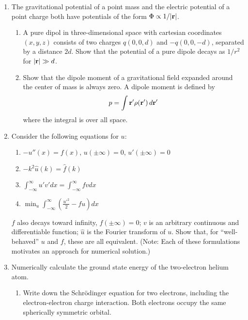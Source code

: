 \documentclass{article}
\begin{document}
\begin{enumerate}

\item \label{prbl:dipolezero}
The gravitational potential of a point mass and the electric potential of a point charge both have potentials of the form $\Phi \propto 1/|{\bf r}|$.
  \begin{enumerate}
  \item
    A pure dipol in three-dimensional space with cartesian coordinates $(x,y,z)$ consists of two charges $q(0,0,d)$ and $-q(0,0,-d)$, separated by a distance $2d$.
    Show that the potential of a pure dipole decays as $1/r^2$ for ${\bf |r|}\gg d$. 
  \item Show that the dipole moment of a gravitational field expanded around the center of mass is always zero.
%
A dipole moment is defined by
\[
p = \int {\bf r'} \rho({\bf r'}) \, d{\bf r'}
\]
where the integral is over all space.
  \end{enumerate}


\item Consider the following equations for $u$:
  \begin{enumerate}
    \item $-u''(x)=f(x)$, $u(\pm\infty)=0$, $u'(\pm\infty)=0$
    \item $-k^2 \hat u(k) = \hat f(k)$ 
    \item $\int_{-\infty}^\infty u' v' dx = \int_{-\infty}^\infty f v dx$ 
    \item $\min_u \int_{-\infty}^\infty \left(\frac{u'^2}{2} - f u \right) dx$ 
  \end{enumerate}
  $f$ also decays toward infinity, $f(\pm\infty)=0$; $v$ is an arbitrary continuous and differentiable function; $\hat u$ is the Fourier transform of $u$.   Show that, for ``well-behaved'' $u$ and $f$, these are all equivalent.   (Note: Each of these formulations motivates an approach for numerical solution.)

  

\item Numerically calculate the ground state energy of the two-electron helium atom.
\vspace{-1em}
\begin{enumerate}\setlength{\itemsep}{0pt}
\item Write down the Schr\"odinger equation for two electrons, including the electron-electron charge interaction.  Both electrons occupy the same spherically symmetric orbital.


\end{enumerate}
\end{enumerate}
\end{document}
